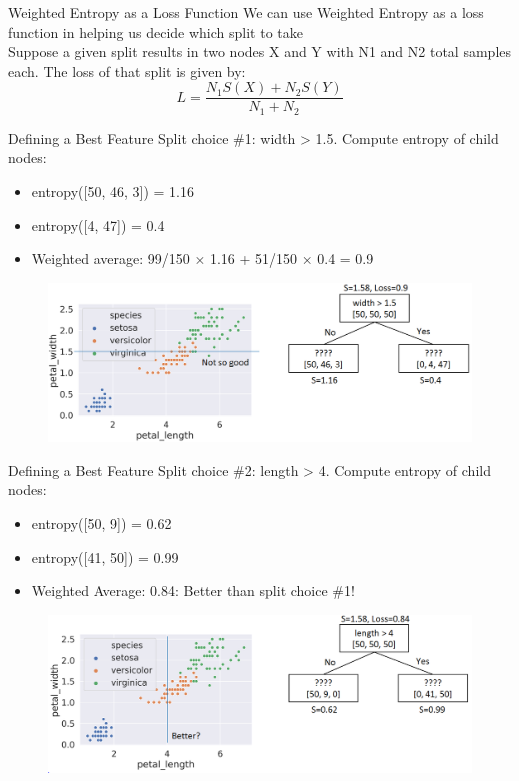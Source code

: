 \documentclass[aspectratio=169]{../latex_main/tntbeamer}  %
\begin{document}
	
	\begin{frame}[c]{Weighted Entropy as a Loss Function}
	    We can use Weighted Entropy as a loss function in helping us decide which split to take\\
	    \bigskip
	    Suppose a given split results in two nodes X and Y with N1 and N2 total samples each. The loss of that split is given by:
	    \begin{equation*}
	        L=\frac{N_1S(X) + N_2S(Y)}{N_1 + N_2}
	    \end{equation*}
	\end{frame}
	
	\begin{frame}{Defining a Best Feature}
	    Split choice \#1: width > 1.5. Compute entropy of child nodes:
	    \begin{itemize}
	        \item entropy([50, 46, 3]) = 1.16
	        \item entropy([4, 47]) = 0.4
	        \item Weighted average: 99/150 × 1.16 + 51/150 × 0.4 = 0.9
	    \end{itemize}
	    
	    \begin{figure}
	        \centering
	        \includegraphics[scale=.4]{Bild48}
	    \end{figure}
	\end{frame}
	
	
	\begin{frame}{Defining a Best Feature}
	    Split choice \#2: length > 4. Compute entropy of child nodes:
	    \begin{itemize}
	        \item entropy([50, 9]) = 0.62
	        \item entropy([41, 50]) = 0.99
	        \item Weighted Average: 0.84: Better than split choice \#1!
	    \end{itemize}
	    
	    \begin{figure}
	        \centering
	        \includegraphics[scale=.4]{Bild49}
	    \end{figure}
	\end{frame}
	
\end{document}
